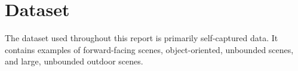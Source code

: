 

\section{Dataset}
The dataset used throughout this report is primarily self-captured data. It contains examples of forward-facing scenes, object-oriented, unbounded scenes, and large, unbounded outdoor scenes.






